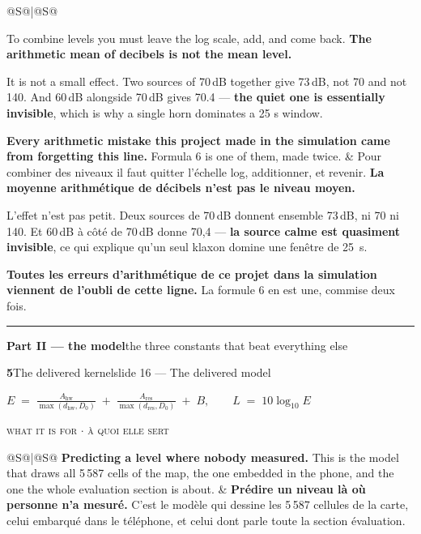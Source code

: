 \documentclass[10pt,a4paper]{article}
\makeatletter
\newcommand{\formula}[3]{%
  \par\vspace{5mm}\noindent
  \colorbox{accent}{\parbox{\dimexpr\textwidth-2\fboxsep}{%
    \color{white}\vspace{.6mm}
    \textbf{#1}\hspace{3mm}#2\hfill\small #3\vspace{.6mm}}}
  \par\vspace{2mm}}
\newcommand{\act}[2]{%
  \par\vspace{7mm}\noindent
  {\color{accent}\rule{\textwidth}{.9pt}}\par\vspace{1.5mm}
  {\large\bfseries\color{accent}#1}\hfill{\color{muted}#2}
  \par\vspace{.5mm}{\color{rule}\rule{\textwidth}{.4pt}}\par}
\newcommand{\eq}[1]{%
  \par\vspace{1mm}\noindent
  \colorbox{wash}{\parbox{\dimexpr\textwidth-2\fboxsep}{%
    \vspace{2mm}\begin{center}$\displaystyle #1$\end{center}\vspace{1mm}}}
  \par\vspace{2mm}}
\newcommand{\forwhat}[2]{%
  \par\vspace{-1mm}\noindent
  {\footnotesize\color{good}\textsc{what it is for \; $\cdot$ \; à quoi elle sert}}
  \par\vspace{1mm}\noindent
  \begin{tabular}{@{}S@{\hspace{5mm}}|@{\hspace{5mm}}S@{}}
    #1 & #2
  \end{tabular}
  \par\vspace{2.5mm}}
\newenvironment{say}{%
  \begin{tabular}{@{}S@{\hspace{5mm}}|@{\hspace{5mm}}S@{}}
}{%
  \end{tabular}\par}
\newcommand{\must}[1]{{\color{good}\textbf{#1}}}
\newcommand{\never}[1]{{\color{bad}\textbf{#1}}}
\makeatother
\begin{document}
\begin{say}
To combine levels you must leave the log scale, add, and come back.
\never{The arithmetic mean of decibels is not the mean level.}

It is not a small effect. Two sources of 70\,dB together give 73\,dB, not 70 and
not 140. And 60\,dB alongside 70\,dB gives 70.4 --- \must{the quiet one is
essentially invisible}, which is why a single horn dominates a 25 s window.

\must{Every arithmetic mistake this project made in the simulation came from
forgetting this line.} Formula 6 is one of them, made twice.
&
Pour combiner des niveaux il faut quitter l'échelle log, additionner, et revenir.
\never{La moyenne arithmétique de décibels n'est pas le niveau moyen.}

L'effet n'est pas petit. Deux sources de 70\,dB donnent ensemble 73\,dB, ni 70 ni
140. Et 60\,dB à côté de 70\,dB donne 70,4 --- \must{la source calme est
quasiment invisible}, ce qui explique qu'un seul klaxon domine une fenêtre de
25~s.

\must{Toutes les erreurs d'arithmétique de ce projet dans la simulation viennent
de l'oubli de cette ligne.} La formule 6 en est une, commise deux fois.
\end{say}

\clearpage
\act{Part II --- the model}{the three constants that beat everything else}

\formula{5}{The delivered kernel}{slide 16 --- The delivered model}
\eq{E \;=\; \frac{A_\mathrm{hw}}{\max(d_\mathrm{hw},D_0)}
        \;+\; \frac{A_\mathrm{res}}{\max(d_\mathrm{res},D_0)}
        \;+\; B,
    \qquad L \;=\; 10\log_{10}E}
\forwhat{\must{Predicting a level where nobody measured.} This is the model that
    draws all 5\,587 cells of the map, the one embedded in the phone, and the one
    the whole evaluation section is about.}{\must{Prédire un niveau là où personne n'a mesuré.} C'est le modèle qui
    dessine les 5\,587 cellules de la carte, celui embarqué dans le téléphone, et
    celui dont parle toute la section évaluation.}
\end{document}

